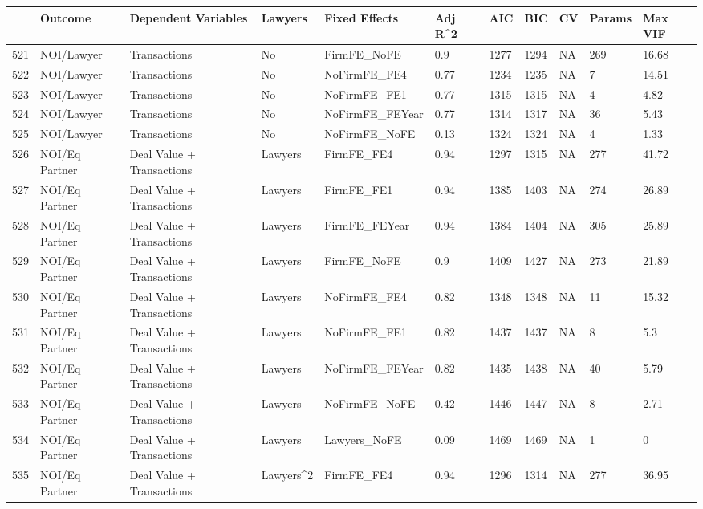 \begin{table}[ht]
\centering
\begin{tabular}{rllllllllll}
  \hline
 & Outcome & Dependent Variables & Lawyers & Fixed Effects & Adj R^2 & AIC & BIC & CV & Params & Max VIF \\ 
  \hline
521 & NOI/Lawyer & Transactions & No & FirmFE\_NoFE & 0.9 & 1277 & 1294 & NA & 269 & 16.68 \\ 
  522 & NOI/Lawyer & Transactions & No & NoFirmFE\_FE4 & 0.77 & 1234 & 1235 & NA & 7 & 14.51 \\ 
  523 & NOI/Lawyer & Transactions & No & NoFirmFE\_FE1 & 0.77 & 1315 & 1315 & NA & 4 & 4.82 \\ 
  524 & NOI/Lawyer & Transactions & No & NoFirmFE\_FEYear & 0.77 & 1314 & 1317 & NA & 36 & 5.43 \\ 
  525 & NOI/Lawyer & Transactions & No & NoFirmFE\_NoFE & 0.13 & 1324 & 1324 & NA & 4 & 1.33 \\ 
  526 & NOI/Eq Partner & Deal Value + Transactions & Lawyers & FirmFE\_FE4 & 0.94 & 1297 & 1315 & NA & 277 & 41.72 \\ 
  527 & NOI/Eq Partner & Deal Value + Transactions & Lawyers & FirmFE\_FE1 & 0.94 & 1385 & 1403 & NA & 274 & 26.89 \\ 
  528 & NOI/Eq Partner & Deal Value + Transactions & Lawyers & FirmFE\_FEYear & 0.94 & 1384 & 1404 & NA & 305 & 25.89 \\ 
  529 & NOI/Eq Partner & Deal Value + Transactions & Lawyers & FirmFE\_NoFE & 0.9 & 1409 & 1427 & NA & 273 & 21.89 \\ 
  530 & NOI/Eq Partner & Deal Value + Transactions & Lawyers & NoFirmFE\_FE4 & 0.82 & 1348 & 1348 & NA & 11 & 15.32 \\ 
  531 & NOI/Eq Partner & Deal Value + Transactions & Lawyers & NoFirmFE\_FE1 & 0.82 & 1437 & 1437 & NA & 8 & 5.3 \\ 
  532 & NOI/Eq Partner & Deal Value + Transactions & Lawyers & NoFirmFE\_FEYear & 0.82 & 1435 & 1438 & NA & 40 & 5.79 \\ 
  533 & NOI/Eq Partner & Deal Value + Transactions & Lawyers & NoFirmFE\_NoFE & 0.42 & 1446 & 1447 & NA & 8 & 2.71 \\ 
  534 & NOI/Eq Partner & Deal Value + Transactions & Lawyers & Lawyers\_NoFE & 0.09 & 1469 & 1469 & NA & 1 & 0 \\ 
  535 & NOI/Eq Partner & Deal Value + Transactions & Lawyers^2 & FirmFE\_FE4 & 0.94 & 1296 & 1314 & NA & 277 & 36.95 \\ 

\end{tabular}
\end{table}
